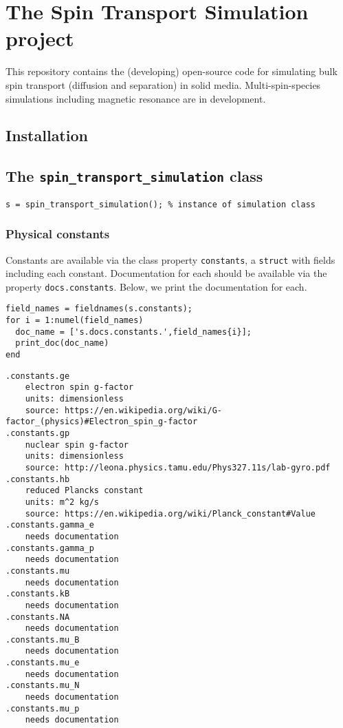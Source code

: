 \hypertarget{the-spin-transport-simulation-project}{%
\section{The Spin Transport Simulation
project}\label{the-spin-transport-simulation-project}}

This repository contains the (developing) open-source code for
simulating bulk spin transport (diffusion and separation) in solid
media. Multi-spin-species simulations including magnetic resonance are
in development.

\hypertarget{installation}{%
\subsection{Installation}\label{installation}}

\hypertarget{the-spin_transport_simulation-class}{%
\subsection{\texorpdfstring{The
\texttt{spin_transport_simulation}
class}{The  class}}\label{the-spin_transport_simulation-class}}

\begin{verbatim}
s = spin_transport_simulation(); % instance of simulation class
\end{verbatim}

\hypertarget{physical-constants}{%
\subsubsection{Physical constants}\label{physical-constants}}

Constants are available via the class property
\texttt{constants}, a \texttt{struct} with
fields including each constant. Documentation for each should be
available via the property \texttt{docs.constants}. Below,
we print the documentation for each.

\begin{verbatim}
field_names = fieldnames(s.constants);
for i = 1:numel(field_names)
  doc_name = ['s.docs.constants.',field_names{i}];
  print_doc(doc_name)
end
\end{verbatim}

\begin{verbatim}
.constants.ge
    electron spin g-factor
    units: dimensionless
    source: https://en.wikipedia.org/wiki/G-factor_(physics)#Electron_spin_g-factor
.constants.gp
    nuclear spin g-factor
    units: dimensionless
    source: http://leona.physics.tamu.edu/Phys327.11s/lab-gyro.pdf
.constants.hb
    reduced Plancks constant
    units: m^2 kg/s
    source: https://en.wikipedia.org/wiki/Planck_constant#Value
.constants.gamma_e
    needs documentation
.constants.gamma_p
    needs documentation
.constants.mu
    needs documentation
.constants.kB
    needs documentation
.constants.NA
    needs documentation
.constants.mu_B
    needs documentation
.constants.mu_e
    needs documentation
.constants.mu_N
    needs documentation
.constants.mu_p
    needs documentation
\end{verbatim}

